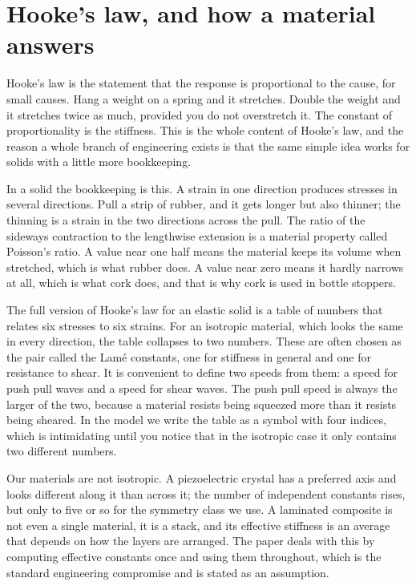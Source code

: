 \documentclass[11pt]{article}
\begin{document}
\section{Hooke's law, and how a material answers}

Hooke's law is the statement that the response is proportional to the cause, for small causes. Hang a weight
on a spring and it stretches. Double the weight and it stretches twice as much, provided you do not
overstretch it. The constant of proportionality is the stiffness. This is the whole content of Hooke's law,
and the reason a whole branch of engineering exists is that the same simple idea works for solids with a
little more bookkeeping.

In a solid the bookkeeping is this. A strain in one direction produces stresses in several directions.
Pull a strip of rubber, and it gets longer but also thinner; the thinning is a strain in the two directions
across the pull. The ratio of the sideways contraction to the lengthwise extension is a material property
called Poisson's ratio. A value near one half means the material keeps its volume when stretched, which is
what rubber does. A value near zero means it hardly narrows at all, which is what cork does, and that is why
cork is used in bottle stoppers.

The full version of Hooke's law for an elastic solid is a table of numbers that relates six stresses to six
strains. For an isotropic material, which looks the same in every direction, the table collapses to two
numbers. These are often chosen as the pair called the Lam\'e constants, one for stiffness in general and one
for resistance to shear. It is convenient to define two speeds from them: a speed for push pull waves and a
speed for shear waves. The push pull speed is always the larger of the two, because a material resists being
squeezed more than it resists being sheared. In the model we write the table as a symbol with four indices,
which is intimidating until you notice that in the isotropic case it only contains two different numbers.

Our materials are not isotropic. A piezoelectric crystal has a preferred axis and looks different along it
than across it; the number of independent constants rises, but only to five or so for the symmetry class we
use. A laminated composite is not even a single material, it is a stack, and its effective stiffness is an
average that depends on how the layers are arranged. The paper deals with this by computing effective
constants once and using them throughout, which is the standard engineering compromise and is stated as an
assumption.
\end{document}
